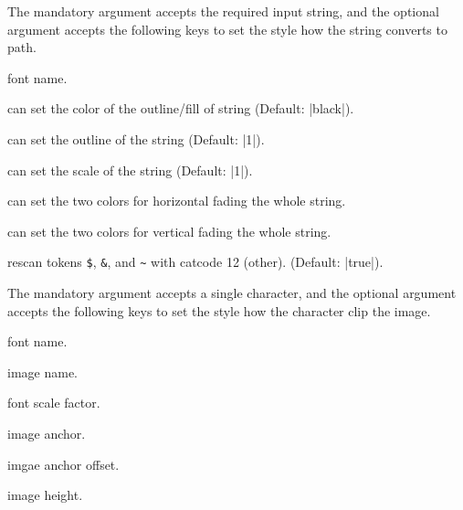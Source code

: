 \documentclass[lm-default]{l3doc}
\def \TTF {\textup{\textbf{true}\textbar}false}
\begin{document}
\begin{documentation}
\begin{function}[added = 2025-07-22]{\chartopath}
  \begin{syntax}
      
  \end{syntax}
  The mandatory argument accepts the required input string, and the optional
  argument accepts the following keys to set the style how the string converts
  to path.
  \begin{keyval}
    \item [\key{font}]  font name.
    \item [\key{draw, fill}]  can set the color of the outline/fill of string
    (Default: |black|).
    \item [\key{outline}]  can set the outline of the string
    (Default: |1|).
    \item [\key{scale}]  can set the scale of the string
    (Default: |1|).
    \item [\key{hfading}]  can set the two colors for horizontal fading the whole string.
    \item [\key{vfading}]  can set the two colors for vertical fading the whole string.
    \item [\key{rescan}] \val{\TTF} rescan tokens \verb|$|, \verb|&|, and \verb|~| with catcode 12 (other). 
    (Default: |true|).
  \end{keyval}
\end{function}

\begin{function}[added = 2025-07-26]{\charpathclip}
  \begin{syntax}
      
  \end{syntax}
  The mandatory argument accepts a single character, and the optional
  argument accepts the following keys to set the style how the character clip
  the image.
  \begin{keyval}
    \item [\key{font}]  font name.
    \item [\key{image}]  image name.
    \item [\key{scale}]  font scale factor.
    \item [\key{anchor}]  image anchor.
    \item [\key{offset}]  imgae anchor offset.
    \item [\key{height}]  image height.
  \end{keyval}
\end{function}


\end{documentation}
\end{document}
